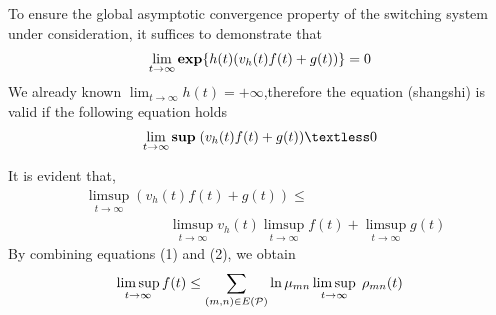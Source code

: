 \documentclass[twocolumn]{autart}    %
\begin{document}
\begin{pf}
    To ensure the global asymptotic convergence property of the switching system under consideration, it suffices to demonstrate that
    \begin{equation}
        \begin{aligned}
            \setlength{\arraycolsep}{0.9pt}
            \lim_{t \rightarrow \infty}\bold{exp}\{h(t)(v_{h}(t)f(t)+g(t)) \} = 0
        \end{aligned}
    \end{equation}
    We already known $\lim_{t \rightarrow \infty}h(t)=+\infty$,therefore the equation (shangshi) is valid if the following equation holds 
    \begin{equation}
        \begin{aligned}
            \setlength{\arraycolsep}{0.9pt}
            \lim_{t \rightarrow \infty} \bold{sup}\;(v_{h}(t)f(t)+g(t)) \textless 0
        \end{aligned}
    \end{equation}
    
It is evident that,
\begin{equation}
    \begin{aligned}
        &\limsup_{t \rightarrow \infty}(v_{h}(t)f(t)+g(t)) \le \\
        &\quad \quad \quad \quad \quad \quad\limsup_{t \rightarrow \infty}v_{h}(t)\limsup_{t \rightarrow \infty}f(t) +\limsup_{t \rightarrow \infty}g(t)
    \end{aligned}
\end{equation}
By combining equations (1) and (2), we obtain
    \begin{equation}
        \begin{aligned}
            \setlength{\arraycolsep}{0.9pt}
            \limsup_{t \rightarrow \infty}f(t) \le \sum_{(m,n) \in E(\mathcal{P})} \ln\mu_{mn}\limsup_{t \rightarrow \infty}\;\rho_{mn}(t)
        \end{aligned}
    \end{equation}
    



\end{pf}
\end{document}
